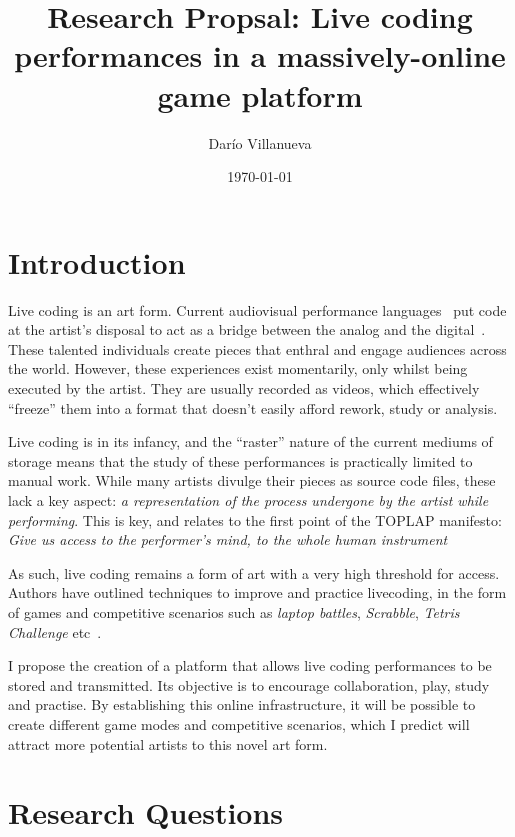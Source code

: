 \documentclass[12pt]{article}
\title{Research Propsal: Live coding performances in a massively-online game platform}
\date{\today}
\author{Darío Villanueva}
\begin{document}
\maketitle

\section*{Introduction}

Live coding is an art form. Current audiovisual performance languages~\cite{gibber, tidal,supercollider,livecodelab} put code at the artist's disposal to act as a bridge between the analog and the digital~\cite{textural-x}. These talented individuals create pieces that enthral and engage audiences across the world. However, these experiences exist momentarily, only whilst being executed by the artist. They are usually recorded as videos, which effectively ``freeze'' them into a format that doesn't easily afford rework, study or analysis.

Live coding is in its infancy, and the ``raster'' nature of the current mediums of storage means that the study of these performances is practically limited to manual work. While many artists divulge their pieces as source code files, these lack a key aspect: \emph{a representation of the process undergone by the artist while performing}. This is key, and relates to the first point of the TOPLAP manifesto: \emph{Give us access to the performer's mind, to the whole human instrument}~\cite{toplap-manifesto}

As such, live coding remains a form of art with a very high threshold for access. Authors have outlined techniques to improve and practice livecoding, in the form of games and competitive scenarios such as \emph{laptop battles}, \emph{Scrabble}, \emph{Tetris Challenge} etc~\cite{laptop-performance, live-coding-practice}.

I propose the creation of a platform that allows live coding performances to be stored and transmitted. Its objective is to encourage collaboration, play, study and practise. By establishing this online infrastructure, it will be possible to create different game modes and competitive scenarios, which I predict will attract more potential artists to this novel art form.


\section*{Research Questions}
\end{document}

